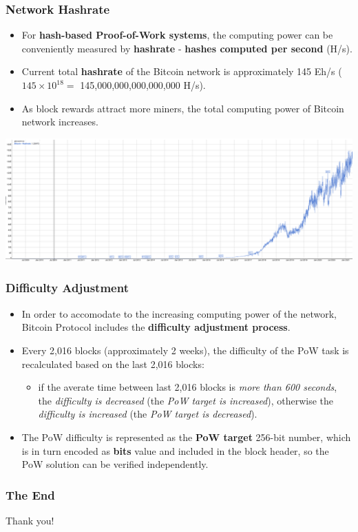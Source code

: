 \documentclass{beamer}
\begin{document}
\begin{frame}
  \frametitle{Network Hashrate}
  \begin{itemize}
  \item For \textbf{hash-based Proof-of-Work systems}, the computing power can
    be conveniently measured by \textbf{hashrate} - \textbf{hashes computed per
      second} (H/s).
  \item Current total \textbf{hashrate} of the Bitcoin network is approximately
    145 Eh/s ($145 \times 10^{18} = $ 145,000,000,000,000,000 H/s).
  \item As block rewards attract more miners, the total computing power of
    Bitcoin network increases.
  \end{itemize}
  \includegraphics[width=\textwidth]{hashrate}
\end{frame}

\begin{frame}
  \frametitle{Difficulty Adjustment}
  \begin{itemize}
  \item In order to accomodate to the increasing computing power of the network,
    Bitcoin Protocol includes the \textbf{difficulty adjustment process}.
  \item Every 2,016 blocks (approximately 2 weeks), the difficulty of the PoW
    task is recalculated based on the last 2,016 blocks:
    \begin{itemize}
    \item if the averate time between last 2,016 blocks is \textit{more than 600
        seconds}, the \textit{difficulty is decreased} (the \textit{PoW target
        is increased}), otherwise the \textit{difficulty is increased} (the
      \textit{PoW target is decreased}).
    \end{itemize}
  \item The PoW difficulty is represented as the \textbf{PoW target} 256-bit
    number, which is in turn encoded as \textbf{bits} value and included in the
    block header, so the PoW solution can be verified independently.
  \end{itemize}
\end{frame}

\begin{frame}
  \frametitle{The End}
  \begin{center}
    Thank you!
  \end{center}
\end{frame}
\end{document}
